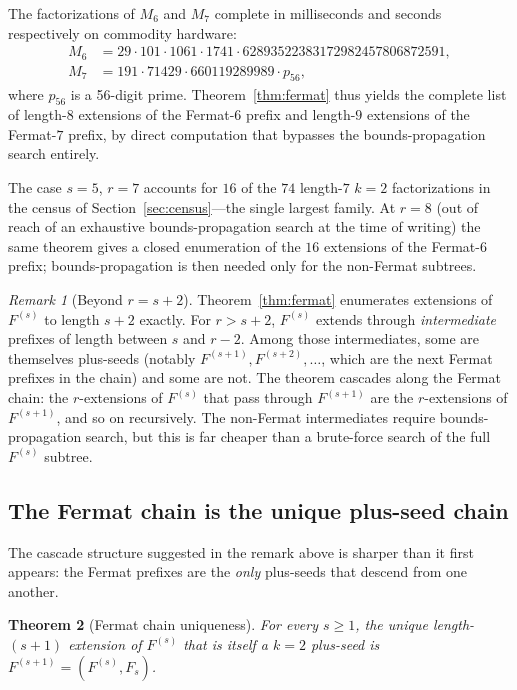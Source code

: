 \documentclass[11pt]{article}
\newtheorem{theorem}{Theorem}
\theoremstyle{definition}
\theoremstyle{remark}
\newtheorem{remark}[theorem]{Remark}
\begin{document}
The factorizations of $M_6$ and $M_7$ complete in milliseconds and
seconds respectively on commodity hardware:
\begin{align*}
M_6 &= 29 \cdot 101 \cdot 1061 \cdot 1741 \cdot 62893522383172982457806872591, \\
M_7 &= 191 \cdot 71429 \cdot 660119289989 \cdot p_{56},
\end{align*}
where $p_{56}$ is a 56-digit prime.  Theorem~\ref{thm:fermat} thus
yields the complete list of length-$8$ extensions of the Fermat-$6$
prefix and length-$9$ extensions of the Fermat-$7$ prefix, by direct
computation that bypasses the bounds-propagation search entirely.

The case $s = 5$, $r = 7$ accounts for $16$ of the $74$ length-$7$
$k = 2$ factorizations in the census of Section~\ref{sec:census}---the
single largest family.  At $r = 8$ (out of reach of an exhaustive
bounds-propagation search at the time of writing) the same theorem
gives a closed enumeration of the $16$ extensions of the Fermat-$6$
prefix; bounds-propagation is then needed only for the non-Fermat
subtrees.

\begin{remark}[Beyond $r = s + 2$]
Theorem~\ref{thm:fermat} enumerates extensions of $F^{(s)}$ to length
$s + 2$ exactly.  For $r > s + 2$, $F^{(s)}$ extends through
\emph{intermediate} prefixes of length between $s$ and $r - 2$.  Among
those intermediates, some are themselves plus-seeds (notably
$F^{(s+1)}, F^{(s+2)}, \ldots$, which are the next Fermat prefixes
in the chain) and some are not.  The theorem cascades along the
Fermat chain: the $r$-extensions of $F^{(s)}$ that pass through
$F^{(s+1)}$ are the $r$-extensions of $F^{(s+1)}$, and so on
recursively.  The non-Fermat intermediates require bounds-propagation
search, but this is far cheaper than a brute-force search of the
full $F^{(s)}$ subtree.
\end{remark}

\subsection{The Fermat chain is the unique plus-seed chain}
\label{subsec:chain-uniqueness}

The cascade structure suggested in the remark above is sharper than
it first appears: the Fermat prefixes are the \emph{only} plus-seeds
that descend from one another.

\begin{theorem}[Fermat chain uniqueness]\label{thm:chain}
For every $s \ge 1$, the unique length-$(s+1)$ extension of $F^{(s)}$
that is itself a $k = 2$ plus-seed is $F^{(s+1)} = (F^{(s)}, F_s)$.
\end{theorem}
\end{document}
